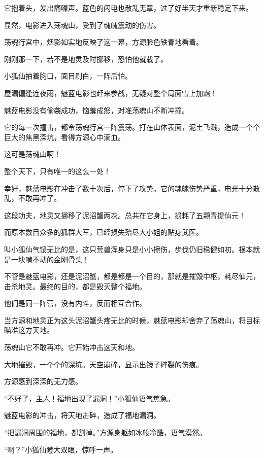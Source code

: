 
\begin{this_body}

它抱着头，发出痛嚎声。蓝色的闪电也散乱无章，过了好半天才重新稳定下来。

显然，电影进入荡魂山，受到了魂魄震动的伤害。

荡魂行宫中，烟影如实地反映了这一幕，方源脸色铁青地看着。

刚刚那一下，若不是地灵及时挪移，恐怕他就栽了。

小狐仙拍着胸口，面目刷白，一阵后怕。

屋漏偏逢连夜雨，魅蓝电影也赶来参战，无疑对整个局面雪上加霜！

魅蓝电影没有偷袭成功，恼羞成怒，对准荡魂山不断冲撞。

它的每一次撞击，都令荡魂行宫一阵震荡。打在山体表面，泥土飞溅，造成一个个巨大的焦黑深坑，看得方源心中滴血。

这可是荡魂山啊！

整个天下，只有唯一的这么一处！

幸好，魅蓝电影在冲击了数十次后，停下了攻势。它的魂魄伤势严重，电光十分散乱，不敢再冲了。

这段功夫，地灵又挪移了泥沼蟹两次。总共在它身上，损耗了五颗青提仙元！

而原本数目众多的狐群大军，已经损失殆尽大小姐的贴身武医。

叫小狐仙气馁无比的是，这只荒兽浑身只是小小擦伤，步伐仍旧稳健如初。根本就是一块啃不动的金刚骨头！

不管是魅蓝电影，还是泥沼蟹，都是都是一个目的，那就是摧毁中枢，耗尽仙元，击杀地灵。最终的目的，都是毁灭整个福地。

他们是同一阵营，没有内斗，反而相互合作。

当方源和地灵正为这头泥沼蟹头疼无比的时候，魅蓝电影却舍弃了荡魂山，将目标瞄准这方天地。

荡魂山它不敢再冲。它开始冲击这天和地。

大地摧毁，一个个的深坑。天空崩碎，显示出镜子碎裂的伤痕。

方源感到深深的无力感。

“不好了，主人！福地出现了漏洞！”小狐仙语气焦急。

魅蓝电影的冲击，将天地击碎，造成了福地漏洞。

“把漏洞周围的福地，都割掉。”方源身躯如冰般冷酷，语气漠然。

“啊？”小狐仙瞪大双眼，惊呼一声。


\end{this_body}
